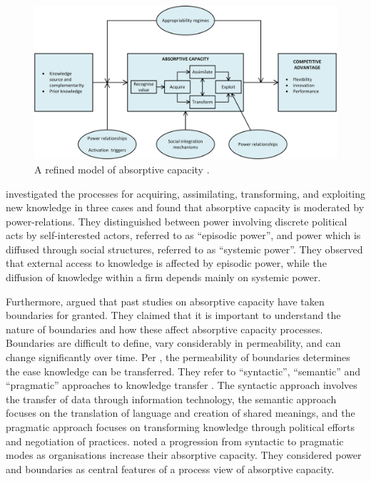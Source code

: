 \begin{figure}
	\centering
	\includegraphics[width=0.9\linewidth]{Images/todorova}
	\caption{A refined model of absorptive capacity \citep{todorova2007absorptive}.}
	\label{fig:todorova}
\end{figure}

\citet{easterby2008absorptive} investigated the processes for acquiring, assimilating, transforming, and exploiting new knowledge in three cases and found that absorptive capacity is moderated by power-relations. They distinguished between power involving discrete political acts by self-interested actors, referred to as \enquote{episodic power}, and power which is diffused through social structures, referred to as \enquote{systemic power}. They observed that external access to knowledge is affected by episodic power, while the diffusion of knowledge within a firm depends mainly on systemic power. \medskip

Furthermore, \citet{easterby2008absorptive} argued that past studies on absorptive capacity have taken boundaries for granted. They claimed that it is important to understand the nature of boundaries and how these affect absorptive capacity processes. Boundaries are difficult to define, vary considerably in permeability, and can change significantly over time. Per \citet{easterby2008absorptive}, the permeability of boundaries determines the ease knowledge can be transferred. They refer to \enquote{syntactic}, \enquote{semantic} and \enquote{pragmatic} approaches to knowledge transfer \citep{carlile2004transferring}. The syntactic approach involves the transfer of data through information technology, the semantic approach focuses on the translation of language and creation of shared meanings, and the pragmatic approach focuses on transforming knowledge through political efforts and negotiation of practices. \citet{easterby2008absorptive} noted a progression from syntactic to pragmatic modes as organisations increase their absorptive capacity. They considered power and boundaries as central features of a process view of absorptive capacity. \medskip

